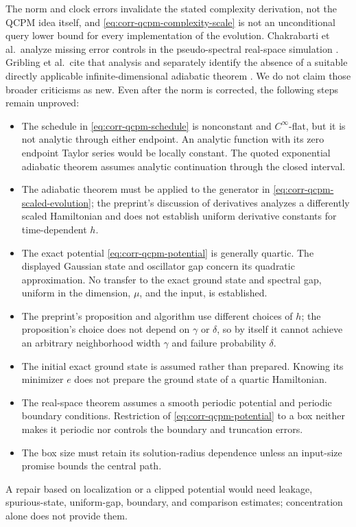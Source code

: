 The norm and clock errors invalidate the stated complexity derivation, not
the QCPM idea itself, and \eqref{eq:corr-qcpm-complexity-scale} is not an
unconditional query lower bound for every implementation of the evolution.
Chakrabarti et al.\ analyze missing error controls in the pseudo-spectral
real-space simulation
\cite{chakrabarti2025-speedups-quantum-dynamics}.  Gribling et al.\ cite
that analysis and separately identify the absence of a suitable directly
applicable infinite-dimensional adiabatic theorem
\cite{gribling2025-self-concordant-schrodinger-operators-spectral}.  We do
not claim those broader criticisms as new.  Even after the norm is
corrected, the following steps remain unproved:
\begin{itemize}[leftmargin=*]
 \item The schedule in \eqref{eq:corr-qcpm-schedule} is nonconstant and
 $C^\infty$-flat, but it is not analytic through either endpoint.  An
 analytic function with its zero endpoint Taylor series would be locally
 constant.  The quoted exponential adiabatic theorem assumes analytic
 continuation through the closed interval.
 \item The adiabatic theorem must be applied to the generator in
 \eqref{eq:corr-qcpm-scaled-evolution}; the preprint's discussion of derivatives analyzes a
 differently scaled Hamiltonian and does not establish uniform derivative
 constants for time-dependent $h$.
 \item The exact potential \eqref{eq:corr-qcpm-potential} is generally
 quartic.  The displayed Gaussian state and oscillator gap concern its
 quadratic approximation.  No transfer to the exact ground state and
 spectral gap, uniform in the dimension, $\mu$, and the input, is
 established.
 \item The preprint's proposition and algorithm use different choices of
 $h$; the proposition's choice does not depend on $\gamma$ or $\delta$, so by
 itself it cannot achieve an arbitrary neighborhood width $\gamma$ and
 failure probability $\delta$.
 \item The initial exact ground state is assumed rather than prepared.
 Knowing its minimizer $e$ does not prepare the ground state of a quartic
 Hamiltonian.
 \item The real-space theorem assumes a smooth periodic potential and
 periodic boundary conditions.  Restriction of
 \eqref{eq:corr-qcpm-potential} to a box neither makes it periodic nor
 controls the boundary and truncation errors.
 \item The box size must retain its solution-radius dependence unless an
 input-size promise bounds the central path.
\end{itemize}
A repair based on localization or a clipped potential would need leakage,
spurious-state, uniform-gap, boundary, and comparison estimates;
concentration alone does not provide them.

